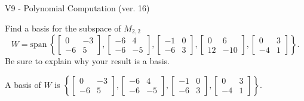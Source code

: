 \begin{exercise}
  \begin{exerciseTitle}V9 - Polynomial Computation (ver. 16)\end{exerciseTitle}
  \begin{exerciseStatement}
    Find a basis for the subspace of \(M_{2,2}\) 
\[W=\mathrm{span}\ \left\{\left[\begin{array}{cc}
0 & -3 \\
-6 & 5
\end{array}\right] , \left[\begin{array}{cc}
-6 & 4 \\
-6 & -5
\end{array}\right] , \left[\begin{array}{cc}
-1 & 0 \\
-6 & 3
\end{array}\right] , \left[\begin{array}{cc}
0 & 6 \\
12 & -10
\end{array}\right] , \left[\begin{array}{cc}
0 & 3 \\
-4 & 1
\end{array}\right]\right\}.\]
 Be sure to explain why your result is a basis.


  \end{exerciseStatement}
  \begin{exerciseAnswer}
   A basis of \(W\) is  \(\left\{\left[\begin{array}{cc}
0 & -3 \\
-6 & 5
\end{array}\right] , \left[\begin{array}{cc}
-6 & 4 \\
-6 & -5
\end{array}\right] , \left[\begin{array}{cc}
-1 & 0 \\
-6 & 3
\end{array}\right] , \left[\begin{array}{cc}
0 & 3 \\
-4 & 1
\end{array}\right]\right\}\).
  


  \end{exerciseAnswer}
\end{exercise}
